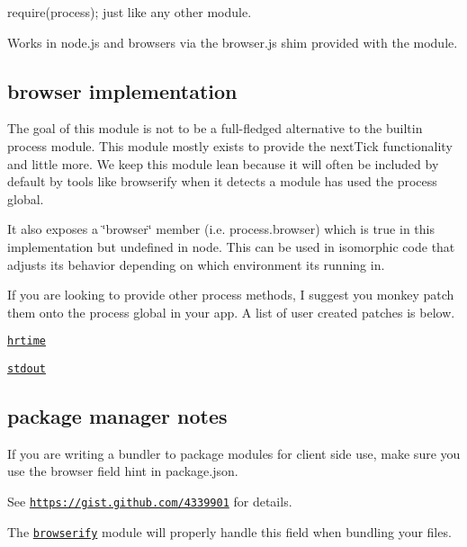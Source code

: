 {\ttfamily require(\textquotesingle{}process\textquotesingle{});} just like any other module.

Works in node.\+js and browsers via the browser.\+js shim provided with the module.

\subsection*{browser implementation}

The goal of this module is not to be a full-\/fledged alternative to the builtin process module. This module mostly exists to provide the next\+Tick functionality and little more. We keep this module lean because it will often be included by default by tools like browserify when it detects a module has used the {\ttfamily process} global.

It also exposes a \char`\"{}browser\char`\"{} member (i.\+e. {\ttfamily process.\+browser}) which is {\ttfamily true} in this implementation but {\ttfamily undefined} in node. This can be used in isomorphic code that adjusts it\textquotesingle{}s behavior depending on which environment it\textquotesingle{}s running in.

If you are looking to provide other process methods, I suggest you monkey patch them onto the process global in your app. A list of user created patches is below.


\begin{DoxyItemize}
\item \href{https://github.com/kumavis/browser-process-hrtime}{\tt hrtime}
\item \href{https://github.com/kumavis/browser-stdout}{\tt stdout}
\end{DoxyItemize}

\subsection*{package manager notes}

If you are writing a bundler to package modules for client side use, make sure you use the {\ttfamily browser} field hint in package.\+json.

See \href{https://gist.github.com/4339901}{\tt https\+://gist.\+github.\+com/4339901} for details.

The \href{https://github.com/substack/node-browserify}{\tt browserify} module will properly handle this field when bundling your files. 